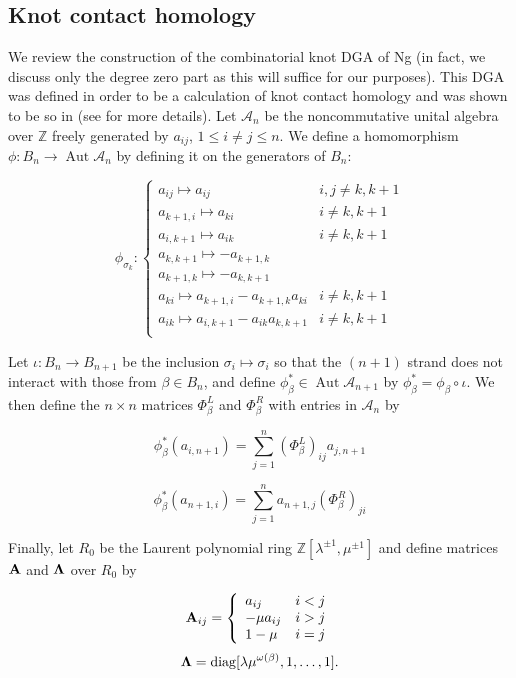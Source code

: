 \documentclass[11pt]{amsart}
\def\Z{{\mathbb Z}}
\def\A{{\mathcal A}}
\def\s{{\sigma}}
\newcommand\Aut{\operatorname{Aut}}
\newcommand\diag{\operatorname{diag}}
\theoremstyle{definition}
\begin{document}
\subsection{Knot contact homology}
\label{SecBG_KCHdef}

  We review the construction of the combinatorial knot DGA of Ng (in fact, we discuss only the degree zero part as this will suffice for our purposes). This DGA was defined in order to be a calculation of knot contact homology and was shown to be so in \cite{EENS12} (see \cite{Ng12} for more details). Let $\A_n$ be the noncommutative unital algebra over $\Z$ freely generated by $a_{ij}$, $1\le i\ne j\le n$. We define a homomorphism $\phi : B_n \rightarrow\Aut \A_n$ by defining it on the generators of $B_n$:

  \begin{equation}
  \phi_{\s_k}\colon
  \left\{
       \begin{array}{lr}
         a_{ij}\mapsto a_{ij} & i,j\ne k,k+1\\
         a_{k+1,i}\mapsto a_{ki} & i\ne k,k+1\\
         a_{i,k+1}\mapsto a_{ik} & i\ne k,k+1\\
         a_{k,k+1}\mapsto -a_{k+1,k} & \\
         a_{k+1,k}\mapsto -a_{k,k+1} & \\
         a_{ki}\mapsto a_{k+1,i} - a_{k+1,k}a_{ki} & i\ne k,k+1\\
         a_{ik}\mapsto a_{i,k+1} - a_{ik}a_{k,k+1} & i\ne k,k+1\\
       \end{array}
  \right.
  \label{DefnPhiMap}
  \end{equation}

  Let $\iota\colon B_n \rightarrow B_{n+1}$ be the inclusion $\s_i\mapsto\s_i$ so that the $(n+1)$ strand does not interact with those from $\beta\in B_n$, and define $\phi_\beta^*\in \Aut \A_{n+1}$ by $\phi_\beta^* = \phi_\beta\circ\iota$. We then define the $n\times n$ matrices $\Phi_\beta^L$ and $\Phi_\beta^R$ with entries in $\A_n$ by

  $$\phi_\beta^*(a_{i,n+1}) = \sum_{j=1}^n(\Phi_\beta^L)_{ij}a_{j,n+1}$$

  $$\phi_\beta^*(a_{n+1,i}) = \sum_{j=1}^na_{n+1,j}(\Phi_\beta^R)_{ji}$$

  Finally, let $R_0$ be the Laurent polynomial ring $\Z[\lambda^{\pm1},\mu^{\pm1}]$ and define matrices $\bf{A}$ and $\bf{\Lambda}$ over $R_0$ by

  \begin{equation}
  {\bf A}_{ij} = 
  \left\{
       \begin{array}{lr}
        a_{ij} & i<j\\
        -\mu a_{ij} & i>j\\
        1-\mu & i = j\\
       \end{array}
  \right.
  \label{def:Amatrix}
  \end{equation}
  \begin{equation}
  {\bf \Lambda} = \diag[\lambda\mu^{\omega(\beta)},1,\ldots,1].
  \label{defn:Lambda}
  \end{equation}
\end{document}
